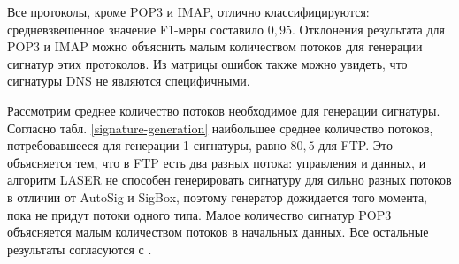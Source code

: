 Все протоколы, кроме POP3 и IMAP, отлично классифицируются: средневзвешенное значение F1-меры составило $0,95$.
Отклонения результата для POP3 и IMAP можно объяснить малым количеством потоков для генерации сигнатур этих протоколов.
Из матрицы ошибок также можно увидеть, что сигнатуры DNS не являются специфичными.

Рассмотрим среднее количество потоков необходимое для генерации сигнатуры.
Согласно табл. \ref{signature-generation} наибольшее среднее количество потоков, потребовавшееся для генерации 1 сигнатуры, равно $80,5$ для FTP.
Это объясняется тем, что в FTP есть два разных потока: управления и данных,
и алгоритм LASER не способен генерировать сигнатуру для сильно разных потоков в отличии от AutoSig и SigBox,
поэтому генератор дожидается того момента, пока не придут потоки одного типа.
Малое количество сигнатур POP3 объясняется малым количеством потоков в начальных данных. Все остальные результаты согласуются с \cite{santosautomatic}.

\begin{table}[ht!]
    \caption{Среднее количество потоков необходимое для генерации сигнатуры.}
    \label{signature-generation}
    \centering
\end{table}

